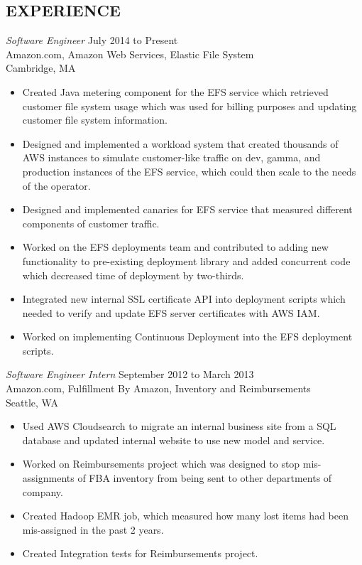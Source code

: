\documentclass[margin]{res}
\begin{document}
\begin{resume}
\section{EXPERIENCE} {\sl Software Engineer} \hfill July 2014 to Present \\
                Amazon.com, Amazon Web Services, Elastic File System \\
                Cambridge, MA 
                 \begin{itemize}  \itemsep -0pt %
                \item Created Java metering component for the EFS service which retrieved customer file system usage which was used for billing purposes and updating customer file system information.
                \item Designed and implemented a workload system that created thousands of AWS instances to simulate customer-like traffic on dev, gamma, and production instances of the EFS service, which could then scale to the needs of the operator.
                \item Designed and implemented canaries for EFS service that measured different components of customer traffic.
                \item Worked on the EFS deployments team and contributed to adding new functionality to pre-existing deployment library and added concurrent code which decreased time of deployment by two-thirds.
                \item Integrated new internal SSL certificate API into deployment scripts which needed to verify and update EFS server certificates with AWS IAM.
                \item Worked on implementing Continuous Deployment into the EFS deployment scripts.
                \end{itemize}
                {\sl Software Engineer Intern} \hfill September 2012 to March 2013 \\
                Amazon.com, Fulfillment By Amazon, Inventory and Reimbursements \\
                Seattle, WA 
                \begin{itemize} \itemsep -0pt
                \item Used AWS Cloudsearch to migrate an internal business site from a SQL database and updated internal website to use new model and service. 
                \item Worked on Reimbursements project which was designed to stop mis-assignments of FBA inventory from being sent to other departments of company.
                \item Created Hadoop EMR job, which measured how many lost items had been mis-assigned in the past 2 years.
                \item Created Integration tests for Reimbursements project.
                \end{itemize}
   

\end{resume}
\end{document}
